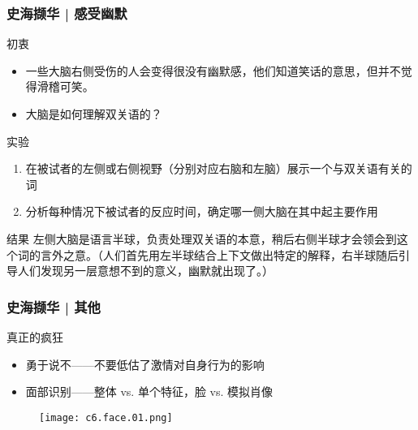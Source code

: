 \begin{frame}
  \frametitle{史海撷华 | 感受幽默}
  \begin{block}{初衷}
    \begin{itemize}
      \item 一些大脑右侧受伤的人会变得很没有幽默感，他们知道笑话的意思，但并不觉得滑稽可笑。
      \item 大脑是如何理解双关语的？
    \end{itemize}
  \end{block}
  \vspace{-0.5em}
  \pause
  \begin{block}{实验}
    \begin{enumerate}
      \item 在被试者的左侧或右侧视野（分别对应右脑和左脑）展示一个与双关语有关的词
      \item 分析每种情况下被试者的反应时间，确定哪一侧大脑在其中起主要作用
    \end{enumerate}
  \end{block}
  \vspace{-0.5em}
  \pause
  \begin{block}{\alert{结果}}
左侧大脑是语言半球，负责处理双关语的本意，稍后右侧半球才会领会到这个词的言外之意。（人们首先用左半球结合上下文做出特定的解释，右半球随后引导人们发现另一层意想不到的意义，幽默就出现了。）
  \end{block}
\end{frame}

\begin{frame}
  \frametitle{史海撷华 | 其他}
  \begin{block}{真正的疯狂}
  \begin{itemize}
    \item 勇于说不——不要低估了激情对自身行为的影响
    \item 面部识别——整体 vs. 单个特征，脸 vs. 模拟肖像
  \end{itemize}
  \vspace{-1em}
  \begin{figure}
    \centering
    \texttt{[image: c6.face.01.png]}
  \end{figure}
  \end{block}
\end{frame}



